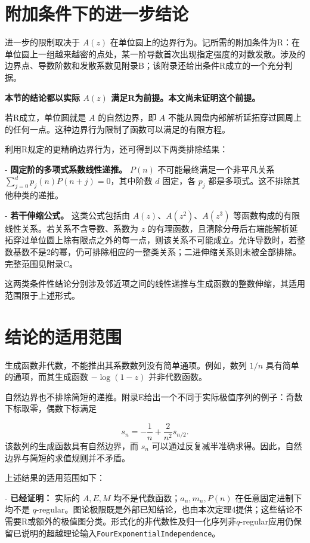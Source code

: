 \documentclass[UTF8,11pt,fontset=fandol]{ctexart}
\begin{document}
\section{附加条件下的进一步结论}
进一步的限制取决于 $A(z)$ 在单位圆上的边界行为。记所需的附加条件为R：在单位圆上一组越来越密的点处，某一阶导数首次出现指定强度的对数发散。涉及的边界点、导数阶数和发散系数见附录B；该附录还给出条件R成立的一个充分判据。

\textbf{本节的结论都以实际 $A(z)$ 满足R为前提。本文尚未证明这个前提。}

若R成立，单位圆就是 $A$ 的自然边界，即 $A$ 不能从圆盘内部解析延拓穿过圆周上的任何一点。这种边界行为限制了函数可以满足的有限方程。

利用R规定的更精确边界行为，还可得到以下两类排除结果：

- \textbf{固定阶的多项式系数线性递推。} $P(n)$ 不可能最终满足一个非平凡关系 $\sum_{j=0}^{d}p_j(n)P(n+j)=0$，其中阶数 $d$ 固定，各 $p_j$ 都是多项式。这不排除其他种类的递推。

- \textbf{若干伸缩公式。} 这类公式包括由 $A(z)$、$A(z^2)$、$A(z^3)$ 等函数构成的有限线性关系。若关系不含导数、系数为 $z$ 的有理函数，且清除分母后右端能解析延拓穿过单位圆上除有限点之外的每一点，则该关系不可能成立。允许导数时，若整数基数不是2的幂，仍可排除相应的一整类关系；二进伸缩关系则未被全部排除。完整范围见附录C。


这两类条件性结论分别涉及邻近项之间的线性递推与生成函数的整数伸缩，其适用范围限于上述形式。

\section{结论的适用范围}
生成函数非代数，不能推出其系数数列没有简单通项。例如，数列 $1/n$ 具有简单的通项，而其生成函数 $-\log(1-z)$ 并非代数函数。

自然边界也不排除简短的递推。附录E给出一个不同于实际极值序列的例子：奇数下标取零，偶数下标满足

\[
s_n=-\frac1n+\frac{2}{n^2}s_{n/2}.
\]
该数列的生成函数具有自然边界，而 $s_n$ 可以通过反复减半准确求得。因此，自然边界与简短的求值规则并不矛盾。

上述结果的适用范围如下：

- \textbf{已经证明：} 实际的 $A,E,M$ 均不是代数函数；$a_n,m_n,P(n)$ 在任意固定进制下均不是 $q$-regular。图论极限既是外部已知结论，也由本次定理4提供；这些结论不需要R或额外的极值图分类。形式化的非代数性及归一化序列非$q$-regular应用仍保留已说明的超越理论输入\texttt{FourExponentialIndependence}。
\end{document}
